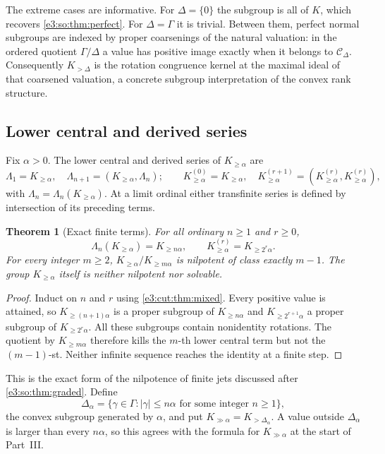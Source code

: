 \documentclass[11pt,letterpaper]{article}
\numberwithin{equation}{section}
\newtheorem{theorem}{Theorem}[section]
\theoremstyle{definition}
\theoremstyle{remark}
\newcommand{\comm}[2]{\left(#1,#2\right)}
\begin{document}
The extreme cases are informative. For $\Delta=\{0\}$ the subgroup is all of
$K$, which recovers \cref{e3:so:thm:perfect}. For $\Delta=\Gamma$ it is
trivial. Between them, perfect normal subgroups are indexed by proper
coarsenings of the natural valuation: in the ordered quotient $\Gamma/\Delta$ a
value has positive image exactly when it belongs to $\mathcal C_\Delta$.
Consequently $K_{>\Delta}$ is the rotation congruence kernel at the maximal
ideal of that coarsened valuation, a concrete subgroup interpretation of the
convex rank structure.

\subsection{Lower central and derived series}

Fix $\alpha>0$. The lower central and derived series of $K_{\ge\alpha}$ are
\[
 \Lambda_1=K_{\ge\alpha},\quad \Lambda_{n+1}=\comm{K_{\ge\alpha}}{\Lambda_n};
 \qquad
 K_{\ge\alpha}^{(0)}=K_{\ge\alpha},\quad
 K_{\ge\alpha}^{(r+1)}=\comm{K_{\ge\alpha}^{(r)}}{K_{\ge\alpha}^{(r)}},
\]
with $\Lambda_n=\Lambda_n(K_{\ge\alpha})$. At a limit ordinal either
transfinite series is defined by intersection of its preceding terms.

\begin{theorem}[Exact finite terms]\label{e3:cut:thm:series}
For all ordinary $n\ge1$ and $r\ge0$,
\begin{equation}\label{e3:cut:eq:series}
 \Lambda_n(K_{\ge\alpha})=K_{\ge n\alpha},\qquad
 K_{\ge\alpha}^{(r)}=K_{\ge2^r\alpha}.
\end{equation}
For every integer $m\ge2$, $K_{\ge\alpha}/K_{\ge m\alpha}$ is nilpotent of class
exactly $m-1$. The group $K_{\ge\alpha}$ itself is neither nilpotent nor
solvable.
\end{theorem}
\begin{proof}
Induct on $n$ and $r$ using \cref{e3:cut:thm:mixed}. Every positive value is
attained, so $K_{\ge(n+1)\alpha}$ is a proper subgroup of $K_{\ge n\alpha}$ and
$K_{\ge2^{r+1}\alpha}$ a proper subgroup of $K_{\ge2^r\alpha}$. All these
subgroups contain nonidentity rotations. The quotient by $K_{\ge m\alpha}$
therefore kills the $m$-th lower central term but not the $(m-1)$-st. Neither
infinite sequence reaches the identity at a finite step.
\end{proof}

This is the exact form of the nilpotence of finite jets discussed after
\cref{e3:so:thm:graded}. Define
\begin{equation}\label{e3:cut:eq:deltaalpha}
 \Delta_\alpha=\{\gamma\in\Gamma:|\gamma|\le n\alpha
 \text{ for some integer }n\ge1\},
\end{equation}
the convex subgroup generated by $\alpha$, and put
$K_{\gg\alpha}=K_{>\Delta_\alpha}$. A value outside $\Delta_\alpha$ is larger
than every $n\alpha$, so this agrees with the formula for $K_{\gg\alpha}$ at
the start of Part~III.
\end{document}
